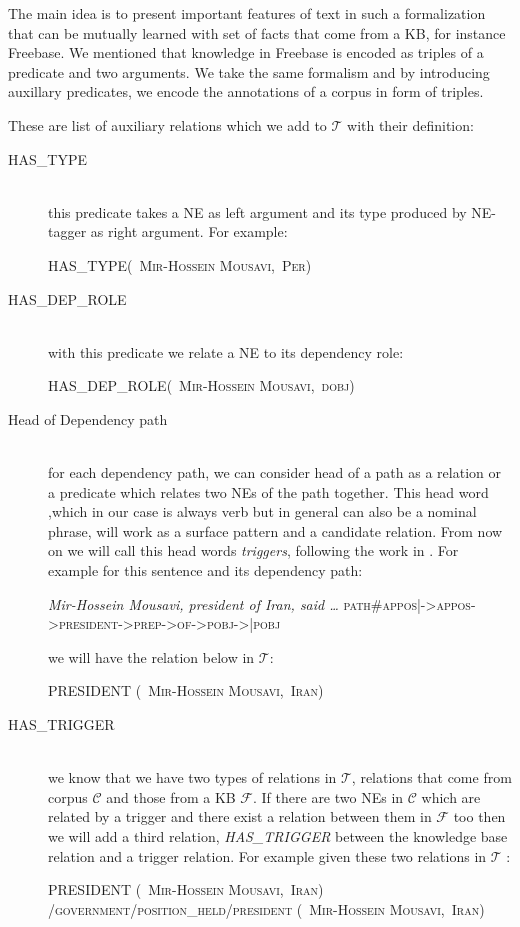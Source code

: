 The main idea is to present important features of text in such a formalization
that can be mutually learned with set of facts that come from a KB, for instance
Freebase. We mentioned that knowledge in Freebase is encoded as triples of a
predicate and two arguments. We take the same formalism and by introducing
auxillary predicates, we encode the annotations of a corpus in form of triples.

These are list of auxiliary relations which we add to $\mathcal{T}$ with their
definition:
\begin {description}
\item[HAS\_TYPE] \hfil \\this predicate takes a NE as left argument and its type
produced by NE-tagger as right argument. For example:
\begin{center}
 \textsc{HAS\_TYPE(~Mir-Hossein Mousavi,~Per)}
 \end{center}

\item[HAS\_DEP\_ROLE]\hfil \\ with this predicate we relate a NE to its
dependency role:

\begin{center}
 \textsc{ HAS\_DEP\_ROLE(~Mir-Hossein Mousavi,~dobj)}
 \end{center}
 
 \item[Head of Dependency path]\hfil \\ for each dependency path, we can
 consider head of a path as a relation or a predicate which relates two NEs of the path
 together. This head word ,which in our case is always verb but in general can
 also be a nominal phrase, will work as a surface pattern and a candidate
 relation. From now on we will call this head words \textit{triggers},
 following the work in \cite{Riedel2013}.
 For example for this sentence and its dependency path:
\begin{center}
 \textit{Mir-Hossein Mousavi, president of Iran, said \ldots}
 \textsc{path\#appos|->appos->president->prep->of->pobj->|pobj }
 \end{center}
 
 we will have the relation below in $\mathcal{T}$:
 \begin{center}
 \textsc{PRESIDENT (~Mir-Hossein Mousavi,~Iran)}
 \end{center}
 


\item[HAS\_TRIGGER]\hfil \\we know that we have two types of relations in
$\mathcal{T}$, relations that come from corpus $\mathcal{C}$ and those from a KB
$\mathcal{F}$. If there are two NEs in $\mathcal{C}$ which are related by a
trigger and there exist a relation between them in $\mathcal{F}$ too then we
will add a third relation, \textit{HAS\_TRIGGER} between the knowledge base
relation and a trigger relation. For example given these two relations in
$\mathcal{T}$ :
\begin{center}
 \textsc{PRESIDENT (~Mir-Hossein Mousavi,~Iran)}
 \textsc{ /government/position\_held/president (~Mir-Hossein Mousavi,~Iran)}
 \end{center}
 

\end{description}
